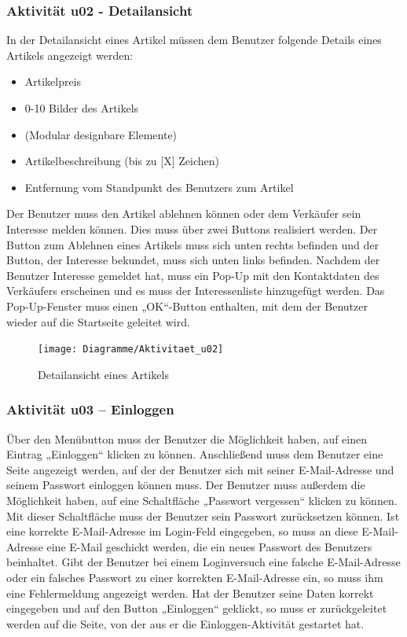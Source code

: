 \documentclass[a4paper,12pt,oneside]{scrartcl}
\begin{document}
\hypertarget{u02}{\subsubsection{Aktivität u02 - Detailansicht}}
In der Detailansicht eines Artikel müssen dem Benutzer folgende Details eines Artikels angezeigt werden:
\begin{itemize}
	\item Artikelpreis
	\item 0-10 Bilder des Artikels
	\item (Modular designbare Elemente)
	\item Artikelbeschreibung (bis zu [X] Zeichen)
	\item Entfernung vom Standpunkt des Benutzers zum Artikel
\end{itemize}
Der Benutzer muss den Artikel ablehnen können oder dem Verkäufer sein Interesse melden können. Dies muss über zwei Buttons realisiert werden. Der Button zum Ablehnen eines Artikels muss sich unten rechts befinden und der Button, der Interesse bekundet, muss sich unten links befinden.
Nachdem der Benutzer Interesse gemeldet hat, muss ein Pop-Up mit den Kontaktdaten des Verkäufers  erscheinen und es muss der Interessenliste hinzugefügt werden. Das Pop-Up-Fenster muss einen „OK“-Button enthalten, mit dem der Benutzer wieder auf die Startseite geleitet wird.

\begin{figure}[!htbp]
\centering
\noindent\texttt{[image: Diagramme/Aktivitaet\_u02]}
\caption{Detailansicht eines Artikels}
\end{figure}
\FloatBarrier


\subsubsection{Aktivität u03 – Einloggen}
Über den Menübutton muss der Benutzer die Möglichkeit haben, auf einen Eintrag „Einloggen“ klicken zu können. Anschließend muss dem Benutzer eine Seite angezeigt werden, auf der der Benutzer sich mit seiner E-Mail-Adresse und seinem Passwort einloggen können muss. Der Benutzer muss außerdem die Möglichkeit haben, auf eine Schaltfläche „Passwort vergessen“ klicken zu können. Mit dieser Schaltfläche muss der Benutzer sein Passwort zurücksetzen können. Ist eine korrekte E-Mail-Adresse im Login-Feld eingegeben, so muss an diese E-Mail-Adresse eine E-Mail geschickt werden, die ein neues Passwort des Benutzers beinhaltet.
Gibt der Benutzer bei einem Loginversuch eine falsche E-Mail-Adresse oder ein falsches Passwort zu einer korrekten E-Mail-Adresse ein, so muss ihm eine Fehlermeldung angezeigt werden. Hat der Benutzer seine Daten korrekt eingegeben und auf den Button „Einloggen“ geklickt, so muss er zurückgeleitet werden auf die Seite, von der aus er die Einloggen-Aktivität gestartet hat.
\end{document}
